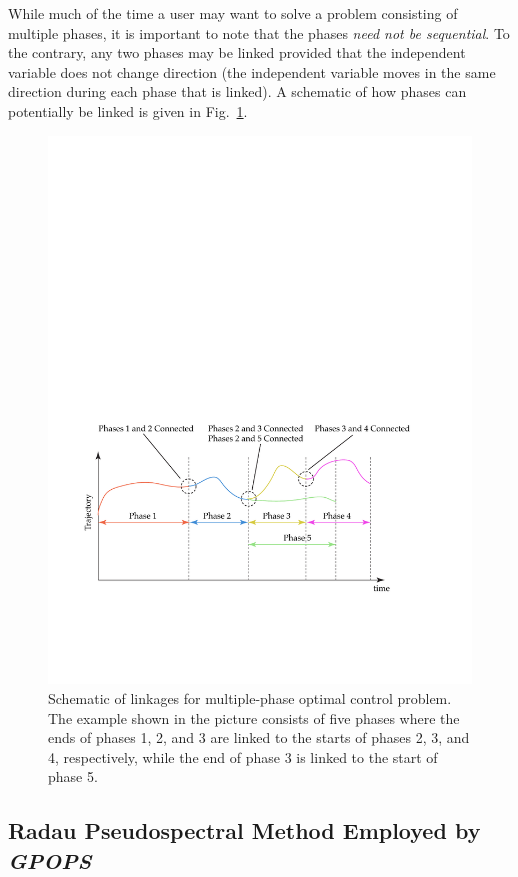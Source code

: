 \documentclass[10pt]{article}
\newcommand{\gpops}{{\em GPOPS}~}
\begin{document}
While much of the time a user may want to solve a problem consisting of
multiple phases, it is important to note that the phases {\em need not
  be sequential}.  To the contrary, any two phases may be linked 
provided that the independent variable does not change direction (\ie the
independent variable moves in the same direction during each phase that is
linked).  A schematic of how phases can potentially be linked is given in
Fig.~\ref{fig: linkages}.
\begin{figure}[h]
  \centering
  \includegraphics[scale=0.95]{linkages.pdf}
  \caption{Schematic of linkages for multiple-phase optimal control problem.
    The example shown in the picture consists of five phases where the ends of
    phases 1, 2, and 3 are linked to the starts of phases 2, 3, and 4,
    respectively, while the end of phase 3 is linked to the start of phase 5.
    \label{fig: linkages}}
\end{figure}

\subsection{Radau Pseudospectral Method Employed by \gpops}
\end{document}
